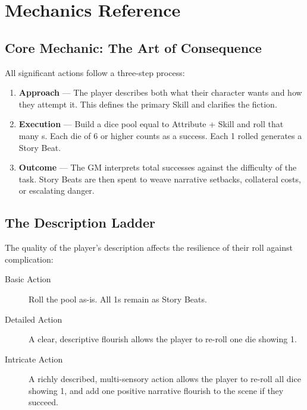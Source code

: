 \chapter{Mechanics Reference}

\section{Core Mechanic: The Art of Consequence}

All significant actions follow a three-step process:

\begin{enumerate}
\item \textbf{Approach} --- The player describes both what their character wants and how they attempt it. This defines the primary Skill and clarifies the fiction.
\item \textbf{Execution} --- Build a dice pool equal to Attribute + Skill and roll that many s. Each die of 6 or higher counts as a success. Each 1 rolled generates a Story Beat.
\item \textbf{Outcome} --- The GM interprets total successes against the difficulty of the task. Story Beats are then spent to weave narrative setbacks, collateral costs, or escalating danger.
\end{enumerate}

\section{The Description Ladder}

The quality of the player's description affects the resilience of their roll against complication:

\begin{description}
\item[Basic Action] Roll the pool as-is. All 1s remain as Story Beats.
\item[Detailed Action] A clear, descriptive flourish allows the player to re-roll one die showing 1.
\item[Intricate Action] A richly described, multi-sensory action allows the player to re-roll all dice showing 1, and add one positive narrative flourish to the scene if they succeed.
\end{description}

